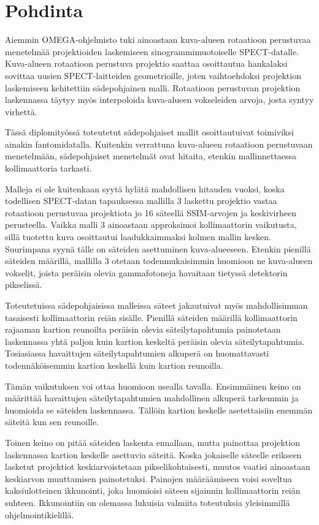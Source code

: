 \section{Pohdinta}
Aiemmin OMEGA-ohjelmisto tuki ainoastaan kuva-alueen rotaatioon perustuvaa menetelmää projektioiden laskemiseen sinogrammimuotoiselle SPECT-datalle. Kuva-alueen rotaatioon perustuva projektio saattaa osoittautua hankalaksi sovittaa uusien SPECT-laitteiden geometrioille, joten vaihtoehdoksi projektion laskemiseen kehitettiin sädepohjainen malli. Rotaatioon perustuvan projektion laskennassa täytyy myös interpoloida kuva-alueen vokseleiden arvoja, josta syntyy virhettä.

Tässä diplomityössä toteutetut sädepohjaiset mallit osoittautuivat toimiviksi ainakin fantomidatalla. Kuitenkin verrattuna kuva-alueen rotaatioon perustuvaan menetelmään, sädepohjaiset menetelmät ovat hitaita, etenkin mallinnettaessa kollimaattoria tarkasti.

Malleja ei ole kuitenkaan syytä hylätä mahdollisen hitauden vuoksi, koska todellisen SPECT-datan tapauksessa mallilla 3 laskettu projektio vastaa rotaatioon perustuvaa projektiota jo 16 säteellä SSIM-arvojen ja keskivirheen perusteella. Vaikka malli 3 ainoastaan approksimoi kollimaattorin vaikutusta, sillä tuotettu kuva osoittautui laadukkaimmaksi kolmen mallin kesken. Suurimpana syynä tälle on säteiden asettuminen kuva-alueeseen. Etenkin pienillä säteiden määrillä, mallilla 3 otetaan todenmukaisimmin huomioon ne kuva-alueen vokselit, joista peräisin olevia gammafotoneja havaitaan tietyssä detektorin pikselissä.

Toteutetuissa sädepohjaisissa malleissa säteet jakautuivat myös mahdollisimman tasaisesti kollimaattorin reiän sisälle. Pienillä säteiden määrillä kollimaattorin rajaaman kartion reunoilta peräisin olevia säteilytapahtumia painotetaan laskennassa yhtä paljon kuin kartion keskeltä peräisin olevia säteilytapahtumia. Tosiasiassa havaittujen säteilytapahtumien alkuperä on huomattavasti todennäköisemmin kartion keskellä kuin kartion reunoilla.

Tämän vaikutuksen voi ottaa huomioon usealla tavalla. Ensimmäinen keino on määrittää havaittujen säteilytapahtumien mahdollinen alkuperä tarkemmin ja huomioida se säteiden laskennassa. Tällöin kartion keskelle asetettaisiin enemmän säteitä kun sen reunoille.

Toinen keino on pitää säteiden laskenta ennallaan, mutta painottaa projektion laskennassa kartion keskelle asettuvia säteitä. Koska jokaiselle säteelle erikseen lasketut projektiot keskiarvoistetaan pikselikohtaisesti, muutos vaatisi ainoastaan keskiarvon muuttamisen painotetuksi. Painojen määräämiseen voisi soveltua kaksiulotteinen ikkunointi, joka huomioisi säteen sijainnin kollimaattorin reiän suhteen. Ikkunointiin on olemassa lukuisia valmiita toteutuksia yleisimmillä ohjelmointikielillä.

